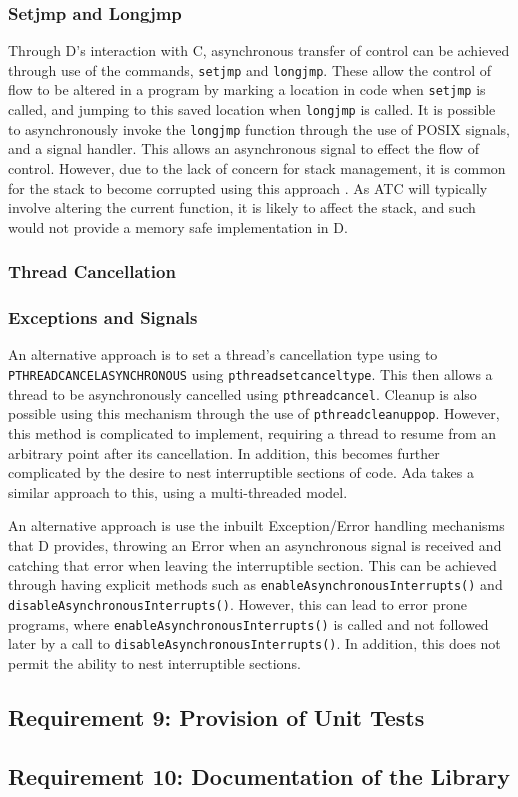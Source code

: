 \subsubsection*{Setjmp and Longjmp} 
Through D's interaction with C, asynchronous transfer of control can be achieved 
through use of the commands, \texttt{setjmp} and \texttt{longjmp}. These allow 
the control of flow to be altered in a program by marking a location in code when 
\texttt{setjmp} is called, and jumping to this saved location when \texttt{longjmp} 
is called. It is possible to asynchronously invoke the \texttt{longjmp} function
through the use of POSIX signals, and a signal handler. This allows an asynchronous 
signal to effect the flow of control. However, due to the lack of concern for 
stack management, it is common for the stack to become corrupted using this approach
\cite{unwinding-stack}. As ATC will typically involve altering the current function, 
it is likely to affect the stack, and such would not provide a memory safe 
implementation in D. 

\subsubsection*{Thread Cancellation}
\subsubsection*{Exceptions and Signals}

An alternative approach is to set a thread's cancellation type using to 
\texttt{PTHREAD\textunderscore{}CANCEL\textunderscore{}ASYNCHRONOUS} using 
\texttt{pthread\textunderscore{}setcanceltype}. This then allows a thread to 
be asynchronously cancelled using \texttt{pthread\textunderscore{}cancel}. Cleanup 
is also possible using this mechanism through the use of 
\texttt{pthread\textunderscore{}cleanup\textunderscore{}pop}. However, 
this method is complicated to implement, requiring a thread to resume from an 
arbitrary point after its cancellation. In addition, this becomes further 
complicated by the desire to nest interruptible sections of code. 
Ada takes a similar approach to this, using a multi-threaded model. 
\par\bigskip\noindent
An alternative approach is use the inbuilt Exception/Error handling mechanisms 
that D provides, throwing an Error when an asynchronous signal is received and 
catching that error when leaving the interruptible section. This can be 
achieved through having explicit methods such as \texttt{enableAsynchronousInterrupts()}
and \texttt{disableAsynchronousInterrupts()}. However, this can lead to error 
prone programs, where \texttt{enableAsynchronousInterrupts()} is called and not 
followed later by a call to \texttt{disableAsynchronousInterrupts()}. 
In addition, this does not permit the ability to nest interruptible sections. 

\subsection{Requirement 9: Provision of Unit Tests}

\subsection{Requirement 10: Documentation of the Library}
